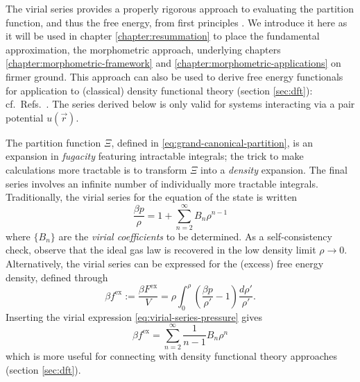 The virial series provides a properly rigorous approach to evaluating the partition function, and thus the free energy, from first principles \cite{UrsellMPCPS1927,MayerJCP1941,MontrollJCP1941,Hansen2013,Santos2016}.
We introduce it here as it will be used in chapter \ref{chapter:resummation} to place the fundamental approximation, the morphometric approach, underlying chapters \ref{chapter:morphometric-framework} and \ref{chapter:morphometric-applications} on firmer ground.
This approach can also be used to derive free energy functionals for application to (classical) density functional theory (section \ref{sec:dft}): cf.\ Refs.\ \cite{LeithallPRE2011,KordenPRE2012,MarechalPRE2014}.
The series derived below is only valid for systems interacting via a pair potential $u(\vec{r})$.

The partition function $\Xi$, defined in \eqref{eq:grand-canonical-partition}, is an expansion in \emph{fugacity} featuring intractable integrals; the trick to make calculations more tractable is to transform $\Xi$ into a \emph{density} expansion.
The final series involves an infinite number of individually more tractable integrals.
Traditionally, the virial series for the equation of the state is written
\begin{equation}\label{eq:virial-series-pressure}
  \frac{\beta p}{\rho}
  =
  1 + \sum_{n=2}^\infty B_n \rho^{n-1}
\end{equation}
where $\{B_n\}$ are the \emph{virial coefficients} to be determined.
As a self-consistency check, observe that the ideal gas law is recovered in the low density limit $\rho \to 0$.
Alternatively, the virial series can be expressed for the (excess) free energy density, defined through
\begin{equation}\label{eq:free-energy-density}
  \beta f^\mathrm{ex}
  :=
  \frac{\beta F^\mathrm{ex}}{V}
  =
  \rho \int_0^\rho \left( \frac{\beta p}{\rho'} - 1 \right)
  \frac{d\rho'}{\rho'}.
\end{equation}
Inserting the virial expression \eqref{eq:virial-series-pressure} gives
\begin{equation}\label{eq:virial-series-excess-free-energy}
  \beta f^\mathrm{ex}
  =
  \sum_{n=2}^\infty
  \frac{1}{n-1}
  B_n
  \rho^n
\end{equation}
which is more useful for connecting with density functional theory approaches (section \ref{sec:dft}).

